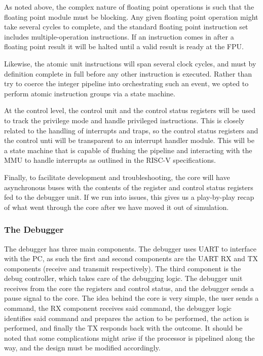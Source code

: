 \documentclass{article}
\begin{document}
    As noted above, the complex nature of floating point operations is such that the floating point module must be blocking. Any given floating point operation might take several cycles to complete, and the standard floating point instruction set includes multiple-operation instructions. If an instruction comes in after a floating point result it will be halted until a valid result is ready at the FPU.
    
    Likewise, the atomic unit instructions will span several clock cycles, and must by definition complete in full before any other instruction is executed.  Rather than try to coerce the integer pipeline into orchestrating such an event, we opted to perform atomic instruction groups via a state machine.
    
    At the control level, the control unit and the control status registers will be used to track the privilege mode and handle privileged instructions.  This is closely related to the handling of interrupts and traps, so the control status registers and the control unti will be transparent to an interrupt handler module.  This will be a state machine that is capable of flushing the pipeline and interacting with the MMU to handle interrupts as outlined in the RISC-V specifications.
    
    Finally, to facilitate development and troubleshooting, the core will have asynchronous buses with the contents of the register and control status registers fed to the debugger unit.  If we run into issues, this gives us a play-by-play recap of what went through the core after we have moved it out of simulation.
    
    \subsubsection{The Debugger}
    The debugger has three main components.  The debugger uses UART to interface with the PC, as such the first and second components are the UART RX and TX components (receive and transmit respectively). The third component is the debug controller, which takes care of the debugging logic. The debugger unit receives from the core the registers and control status, and the debugger sends a pause signal to the core. The idea behind the core is very simple, the user sends a command, the RX component receives said command, the debugger logic identifies said command and prepares the action to be performed, the action is performed, and finally the TX responds back with the outcome.
    It should be noted that some complications might arise if the processor is pipelined along the way, and the design must be modified   accordingly.
    
\end{document}
